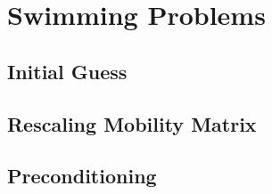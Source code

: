 \section{Swimming Problems}

\subsection{Initial Guess}

\subsection{Rescaling Mobility Matrix}

\subsection{Preconditioning}